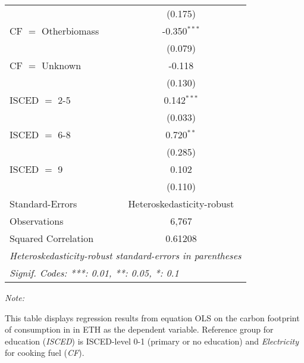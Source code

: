 \begin{table}[htbp!]
\begin{adjustbox}{width = 1\textwidth, max height = 0.95\textheight, center}
\begin{threeparttable}[b]
\begin{tabular}{lc}
                                & (0.175)\\   
            CF $=$ Otherbiomass & -0.350$^{***}$\\   
                                & (0.079)\\   
            CF $=$ Unknown      & -0.118\\   
                                & (0.130)\\   
            ISCED $=$ 2-5       & 0.142$^{***}$\\   
                                & (0.033)\\   
            ISCED $=$ 6-8       & 0.720$^{**}$\\   
                                & (0.285)\\   
            ISCED $=$ 9         & 0.102\\   
                                & (0.110)\\   
            \midrule 
            Standard-Errors     & Heteroskedasticity-robust \\   
            Observations        & 6,767\\  
            Squared Correlation & 0.61208\\  
            \midrule \midrule
            \multicolumn{2}{l}{\emph{Heteroskedasticity-robust standard-errors in parentheses}}\\
            \multicolumn{2}{l}{\emph{Signif. Codes: ***: 0.01, **: 0.05, *: 0.1}}\\
         \end{tabular}
         
         \begin{tablenotes}\item \medskip \textit{Note:}
            \item This table displays regression results from equation OLS on the carbon footprint of consumption in  in ETH as the dependent variable.  Reference group for education (\textit{ISCED}) is ISCED-level 0-1 (primary or no education) and \textit{Electricity} for cooking fuel (\textit{CF}).
         \end{tablenotes}
      \end{threeparttable}
   \end{adjustbox}
\end{table}


